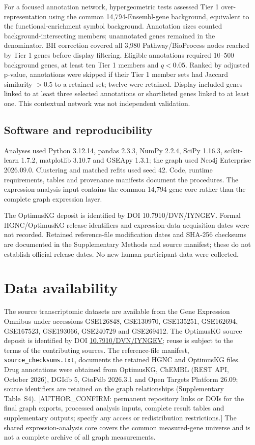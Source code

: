 \documentclass[11pt,a4paper]{article}
\begin{document}
For a focused annotation network, hypergeometric tests assessed Tier 1 over-representation using the common 14,794-Ensembl-gene background, equivalent to the functional-enrichment symbol background. Annotation sizes counted background-intersecting members; unannotated genes remained in the denominator. BH correction covered all 3,980 Pathway/BioProcess nodes reached by Tier 1 genes before display filtering. Eligible annotations required 10--500 background genes, at least ten Tier 1 members and $q<0.05$. Ranked by adjusted p-value, annotations were skipped if their Tier 1 member sets had Jaccard similarity $>0.5$ to a retained set; twelve were retained. Display included genes linked to at least three selected annotations or shortlisted genes linked to at least one. This contextual network was not independent validation.

\subsection*{Software and reproducibility}
Analyses used Python 3.12.14, pandas 2.3.3, NumPy 2.2.4, SciPy 1.16.3, scikit-learn 1.7.2, matplotlib 3.10.7 and GSEApy 1.3.1; the graph used Neo4j Enterprise 2026.09.0. Clustering and matched refits used seed 42. Code, runtime requirements, tables and provenance manifests document the procedures. The expression-analysis input contains the common 14,794-gene core rather than the complete graph expression layer.

The OptimusKG deposit is identified by DOI 10.7910/DVN/IYNGEV. Formal HGNC/OptimusKG release identifiers and expression-data acquisition dates were not recorded. Retained reference-file modification dates and SHA-256 checksums are documented in the Supplementary Methods and source manifest; these do not establish official release dates. No new human participant data were collected.

\section*{Data availability}
The source transcriptomic datasets are available from the Gene Expression Omnibus under accessions GSE126848, GSE130970, GSE135251, GSE162694, GSE167523, GSE193066, GSE240729 and GSE269412. The OptimusKG source deposit is identified by DOI \href{https://doi.org/10.7910/DVN/IYNGEV}{10.7910/DVN/IYNGEV}; reuse is subject to the terms of the contributing sources. The reference-file manifest, \nolinkurl{source_checksums.txt}, documents the retained HGNC and OptimusKG files. Drug annotations were obtained from OptimusKG, ChEMBL (REST API, October 2026), DGIdb 5, GtoPdb 2026.3.1 and Open Targets Platform 26.09; source identifiers are retained on the graph relationships (Supplementary Table~S4). [AUTHOR\_CONFIRM: permanent repository links or DOIs for the final graph exports, processed analysis inputs, complete result tables and supplementary outputs; specify any access or redistribution restrictions.] The shared expression-analysis core covers the common measured-gene universe and is not a complete archive of all graph measurements.
\end{document}
